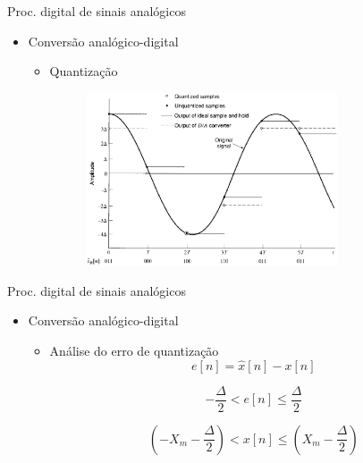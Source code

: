 \begin{slide}{Proc. digital de sinais anal\'ogicos}
\begin{itemize}
   \item Conversão analógico-digital
   \begin{itemize}
      \item Quantização 
      \begin{figure}
        \centering
         \includegraphics[width = 0.75\textwidth]{figs/ad_quantz2.eps}
      \end{figure}

   \end{itemize}
\end{itemize}
\end{slide}

\begin{slide}{Proc. digital de sinais anal\'ogicos}
\begin{itemize}
   \item Conversão analógico-digital
   \begin{itemize}
      \item Análise do erro de quantização
      \begin{equation}
        e[n] = \hat x[n] - x[n]
      \end{equation}

        \begin{equation}
         -\frac{\Delta}{2}<e[n]\leq \frac{\Delta}{2}
        \end{equation}

        \begin{equation}
         \left (-X_m-\frac{\Delta}{2}\right )<x[n]\leq \left (X_m-\frac{\Delta}{2}\right )
        \end{equation}



   \end{itemize}
\end{itemize}
\end{slide}

